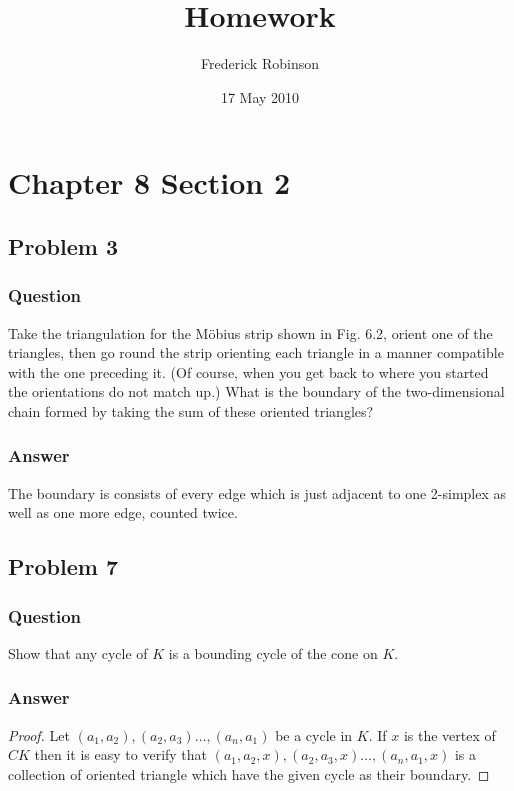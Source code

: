 \documentclass[10pt]{article}
\title{Homework}
\author{Frederick Robinson}
\date{17 May 2010}
\begin{document}

   \maketitle

\section{Chapter 8 Section 2}

\subsection{Problem 3}
\subsubsection{Question}
Take the triangulation for the M\"obius strip shown in Fig. 6.2, orient one of the triangles, then go round the strip orienting each triangle in a manner compatible with the one preceding it. (Of course, when you get back to where you started the orientations do not match up.) What is the boundary of the two-dimensional chain formed by taking the sum of these oriented triangles?
\subsubsection{Answer}
The boundary is consists of every edge which is just adjacent to one 2-simplex as well as one more edge, counted twice.

\subsection{Problem 7}
\subsubsection{Question}
Show that any cycle of $K$ is a bounding cycle of the cone on $K$.
\subsubsection{Answer}
\begin{proof}
Let $(a_1,a_2), (a_2,a_3) \dots, (a_n,a_1)$ be a cycle in $K$. If $x$ is the vertex of $CK$ then it is easy to verify that $(a_1,a_2, x), (a_2,a_3,x) \dots, (a_n,a_1,x)$ is a collection of oriented triangle which have the given cycle as their boundary.
\end{proof}
\end{document}
